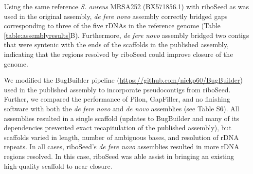 \documentclass[a4,center,fleqn]{NAR}
\begin{document}

Using the same reference \textit{S. aureus} MRSA252\cite{Holden2004} (BX571856.1) with riboSeed as was used in the original assembly, \textit{de fere novo} assembly correctly bridged gaps corresponding to three of the five rDNAs in the reference genome (Table \ref{table:assemblyresults}B). Furthermore, \textit{de fere novo} assembly bridged two contigs that were syntenic with the ends of the scaffolds in the published assembly, indicating that the regions resolved by riboSeed could improve closure of the genome.

We modified the BugBuilder pipeline (\url{https://github.com/nickp60/BugBuilder}\cite{Abbott2017}) used in the published assembly to incorporate pseudocontigs from riboSeed. Further, we compared the performance of Pilon, GapFiller, and no finishing software with both the \textit{de fere novo} and \textit{de novo} assemblies (see Table S6). All assemblies resulted in a single scaffold (updates to BugBuilder and many of its dependencies prevented exact recapitulation of the published assembly), but scaffolds varied in length, number of ambiguous bases, and resolution of rDNA repeats. In all cases, riboSeed's \textit{de fere novo} assemblies resulted in more rDNA regions resolved. In this case, riboSeed was able assist in bringing an existing high-quality scaffold to near closure.
\end{document}

